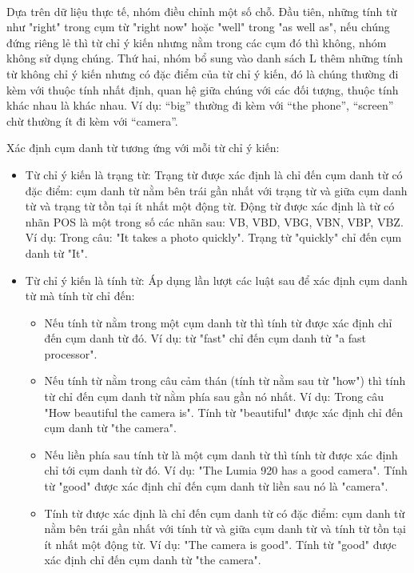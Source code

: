\documentclass[12pt]{report}
\begin{document}
					\\ Dựa trên dữ liệu thực tế, nhóm điều chỉnh một số chỗ. Đầu tiên, những tính từ như "right" trong cụm từ "right now" hoặc "well" trong "as well as", nếu chúng đứng riêng lẻ thì từ chỉ ý kiến nhưng nằm trong các cụm đó thì không, nhóm không sử dụng chúng. Thứ hai, nhóm bổ sung vào danh sách L thêm những tính từ không chỉ ý kiến nhưng có đặc điểm của từ chỉ ý kiến, đó là chúng thường đi kèm với thuộc tính nhất định, quan hệ giữa chúng với các đối tượng, thuộc tính khác nhau là khác nhau. Ví dụ: “big” thường đi kèm với “the phone”, “screen” chừ thường ít đi kèm với “camera”.
					\par Xác định cụm danh từ tương ứng với mỗi từ chỉ ý kiến:
					\begin{itemize}
						\item{Từ chỉ ý kiến là trạng từ:
						Trạng từ được xác định là chỉ đến cụm danh từ có đặc điểm: cụm danh từ nằm bên trái gần nhất với trạng từ và giữa cụm danh từ và trạng từ tồn tại ít nhất một động từ. Động từ được xác định là từ có nhãn POS là một trong số các nhãn sau: VB, VBD, VBG, VBN, VBP, VBZ. Ví dụ: Trong câu: "It takes a photo quickly". Trạng từ "quickly" chỉ đến cụm danh từ "It".}
						\item{Từ chỉ ý kiến là tính từ: 
						Áp dụng lần lượt các luật sau để xác định cụm danh từ mà tính từ chỉ đến:
							\begin{itemize}
								\item{Nếu tính từ nằm trong một cụm danh từ thì tính từ được xác định chỉ đến cụm danh từ đó. Ví dụ: từ "fast" chỉ đến cụm danh từ "a fast processor".}
								\item{Nếu tính từ nằm trong câu cảm thán (tính từ nằm sau từ "how") thì tính từ chỉ đến cụm danh từ nằm phía sau gần nó nhất. Ví dụ: Trong câu "How beautiful the camera is". Tính từ "beautiful" được xác định chỉ đến cụm danh từ "the camera".}
								\item{Nếu liền phía sau tính từ là một cụm danh từ thì tính từ được xác định chỉ tới cụm danh từ đó. Ví dụ: "The Lumia 920 has a good camera". Tính từ "good" được xác định chỉ đến cụm danh từ liền sau nó là "camera".}
								\item{Tính từ được xác định là chỉ đến cụm danh từ có đặc điểm: cụm danh từ nằm bên trái gần nhất với tính từ và giữa cụm danh từ và tính từ tồn tại ít nhất một động từ. Ví dụ: "The camera is good". Tính từ "good" được xác định chỉ đến cụm danh từ "the camera".}
							\end{itemize}}
					\end{itemize}
\end{document}
